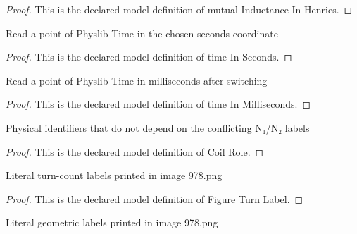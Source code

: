 \begin{proof}
  This is the declared model definition of mutual Inductance In Henries.
\end{proof}
\begin{definition}
  \label{def:physics:phyx-mini-0978:phyxminiproblems-problemphyxmini0978-timeinseconds}
  Read a point of Physlib Time in the chosen seconds coordinate
\end{definition}
\begin{proof}
  This is the declared model definition of time In Seconds.
\end{proof}
\begin{definition}
  \label{def:physics:phyx-mini-0978:phyxminiproblems-problemphyxmini0978-timeinmilliseconds}
  Read a point of Physlib Time in milliseconds after switching
\end{definition}
\begin{proof}
  This is the declared model definition of time In Milliseconds.
\end{proof}
\begin{definition}
  \label{def:physics:phyx-mini-0978:phyxminiproblems-problemphyxmini0978-coilrole}
  Physical identifiers that do not depend on the conflicting N₁/N₂ labels
\end{definition}
\begin{proof}
  This is the declared model definition of Coil Role.
\end{proof}
\begin{definition}
  \label{def:physics:phyx-mini-0978:phyxminiproblems-problemphyxmini0978-figureturnlabel}
  Literal turn-count labels printed in image 978.png
\end{definition}
\begin{proof}
  This is the declared model definition of Figure Turn Label.
\end{proof}
\begin{definition}
  \label{def:physics:phyx-mini-0978:phyxminiproblems-problemphyxmini0978-figurelengthlabel}
  Literal geometric labels printed in image 978.png
\end{definition}
